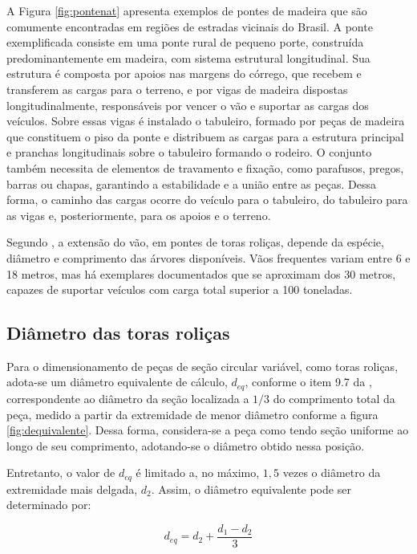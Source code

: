 A Figura \ref{fig:pontenat} apresenta exemplos de pontes de madeira que são comumente encontradas
em regiões de estradas vicinais do Brasil. A ponte exemplificada consiste em uma ponte rural de pequeno porte, construída predominantemente em madeira, com sistema estrutural longitudinal. Sua estrutura é composta por apoios nas margens do córrego, que recebem e transferem as cargas para o terreno, e por vigas de madeira dispostas longitudinalmente, responsáveis por vencer o vão e suportar as cargas dos veículos. Sobre essas vigas é instalado o tabuleiro, formado por peças de madeira que constituem o piso da ponte e distribuem as cargas para a estrutura principal e pranchas longitudinais sobre o tabuleiro formando o rodeiro. O conjunto também necessita de elementos de travamento e fixação, como parafusos, pregos, barras ou chapas, garantindo a estabilidade e a união entre as peças. Dessa forma, o caminho das cargas ocorre do veículo para o tabuleiro, do tabuleiro para as vigas e, posteriormente, para os apoios e o terreno.

Segundo \textcite{ritter1990}, a extensão do vão, em pontes de toras roliças, depende da espécie, diâmetro e
comprimento das árvores disponíveis.
Vãos frequentes variam entre 6 e 18 metros, mas há exemplares documentados que se aproximam dos 30 metros, capazes de suportar
veículos com carga total superior a 100 toneladas.

\subsection{Diâmetro das toras roliças}

Para o dimensionamento de peças de seção circular variável, como toras roliças, adota-se um diâmetro equivalente de cálculo, $d_{eq}$, conforme o item 9.7 da \textcite{NBR7190-1:2022}, correspondente ao diâmetro da seção localizada a $1/3$ do comprimento total da peça, medido a partir da extremidade de menor diâmetro conforme a figura \ref{fig:dequivalente}. Dessa forma, considera-se a peça como tendo seção uniforme ao longo de seu comprimento, adotando-se o diâmetro obtido nessa posição.

Entretanto, o valor de $d_{eq}$ é limitado a, no máximo, $1,5$ vezes o diâmetro da extremidade mais delgada, $d_2$. Assim, o diâmetro equivalente pode ser determinado por:

\begin{equation}
d_{eq} = d_2 + \frac{d_1-d_2}{3}
\end{equation}

